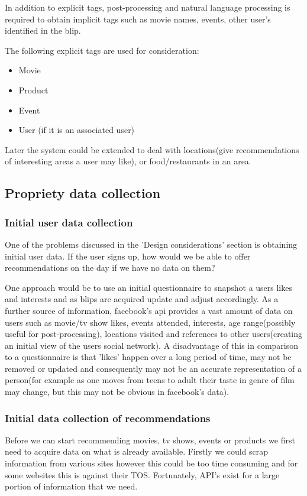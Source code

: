 \documentclass[11pt]{article}
\begin{document}
In addition to explicit tags, post-processing and natural language processing is required to obtain implicit tags such as movie names, events, other user's identified in the blip. 

The following explicit tags are used for consideration:

\begin{itemize}
\item Movie
\item Product
\item Event
\item User (if it is an associated user)
\end{itemize}

Later the system could be extended to deal with locations(give recommendations of interesting areas a user may like), or food/restaurants in an area.

\subsection{Propriety data collection}

\subsubsection{Initial user data collection}
One of the problems discussed in the 'Design considerations' section is obtaining initial user data. If the user signs up, how would we be able to offer recommendations on the day if we have no data on them? 

One approach would be to use an initial questionnaire to snapshot a users likes and interests and as blips are acquired update and adjust accordingly. As a further source of information, facebook's api provides a vast amount of data on users such as movie/tv show likes, events attended, interests, age range(possibly useful for post-processing), locations visited and references to other users(creating an initial view of the users social network). A disadvantage of this in comparison to a questionnaire is that 'likes' happen over a long period of time, may not be removed or updated and consequently may not be an accurate representation of a person(for example as one moves from teens to adult their taste in genre of film may change, but this may not be obvious in facebook's data). 

\subsubsection{Initial data collection of recommendations}
Before we can start recommending movies, tv shows, events or products we first need to acquire data on what is already available. Firstly we could scrap information from various sites however this could be too time consuming and for some websites this is against their TOS. Fortunately, API's exist for a large portion of information that we need.
\end{document}
